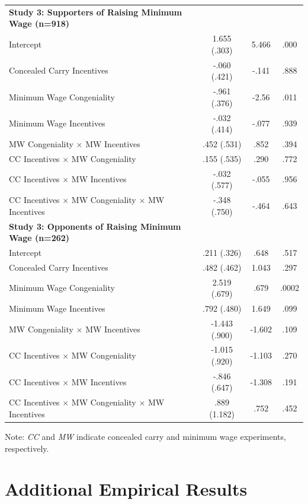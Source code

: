 \documentclass[12pt, letterpaper]{article}
\begin{document}
\begin{table}[ht]
\begin{tabular}{l c c c}
{\bf Study 3: Supporters of Raising Minimum Wage (n=918)}  & & & \\ 
  Intercept 									& 1.655 (.303) 	& 5.466 	& .000 \\ 
  Concealed Carry Incentives					& -.060 (.421) 	& -.141 	& .888 \\ 
  Minimum Wage Congeniality					& -.961 (.376) 	& -2.56 	& .011 \\ 
  Minimum Wage Incentives						& -.032 (.414) 	& -.077 	& .939 \\ 
  MW Congeniality $\times$ MW Incentives			& .452 (.531) 	& .852 	& .394 \\ 
  CC Incentives $\times$ MW Congeniality			& .155 (.535)	& .290 	& .772 \\ 
  CC Incentives $\times$ MW Incentives			& -.032 (.577) 	& -.055 	& .956 \\ 
  CC Incentives $\times$ MW Congeniality $\times$ MW Incentives 
										& -.348 (.750)	& -.464 	& .643 \\ \hline
{\bf Study 3: Opponents of Raising Minimum Wage (n=262)}  & & & \\ 
  Intercept 									& .211 (.326) 	& .648 	& .517 \\ 
  Concealed Carry Incentives					& .482 (.462) 	& 1.043 	& .297 \\ 
  Minimum Wage Congeniality					& 2.519 (.679) 	& .679 	& .0002 \\ 
  Minimum Wage Incentives						& .792 (.480) 	& 1.649 	& .099 \\ 
  MW Congeniality $\times$ MW Incentives			& -1.443 (.900) 	& -1.602 	& .109 \\ 
  CC Incentives $\times$ MW Congeniality			& -1.015 (.920)	& -1.103 	& .270 \\ 
  CC Incentives $\times$ MW Incentives			& -.846 (.647) 	& -1.308 	& .191 \\ 
  CC Incentives $\times$ MW Congeniality $\times$ MW Incentives 
										& .889 (1.182)	& .752 	& .452 \\ 
   \hline
\end{tabular}
Note: {\it CC} and {\it MW} indicate concealed carry and minimum wage experiments, respectively.
\end{table}
\normalsize
\doublespacing

\clearpage
\doublespacing
\section{Additional Empirical Results}
\end{document}
